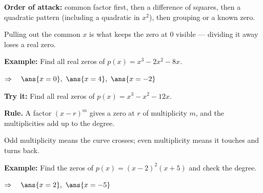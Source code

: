 \documentclass[12pt]{article}
\begin{document}


\begin{formulabox}
\textbf{Order of attack:} common factor first, then a difference of squares, then a quadratic pattern (including a quadratic in $x^{2}$), then grouping or a known zero.\par
Pulling out the common $x$ is what keeps the zero at $0$ visible --- dividing it away loses a real zero.
\end{formulabox}

\begin{examplebox}
\textbf{Example:} \quad Find all real zeros of $p(x) = x^{3} - 2x^{2} - 8x$.

$\Rightarrow\quad \ans{x = 0}, \ \ans{x = 4}, \ \ans{x = -2}$
\end{examplebox}

\begin{tryitbox}
\textbf{Try it:} \quad Find all real zeros of $p(x) = x^{3} - x^{2} - 12x$.\\[2pt]
\end{tryitbox}


\begin{formulabox}
\textbf{Rule.} A factor $(x - r)^{m}$ gives a zero at $r$ of multiplicity $m$, and the multiplicities add up to the degree.\par
Odd multiplicity means the curve crosses; even multiplicity means it touches and turns back.
\end{formulabox}

\begin{examplebox}
\textbf{Example:} \quad Find the zeros of $p(x) = (x - 2)^{2}(x + 5)$ and check the degree.

$\Rightarrow\quad \ans{x = 2}, \ \ans{x = -5}$
\end{examplebox}
\end{document}

